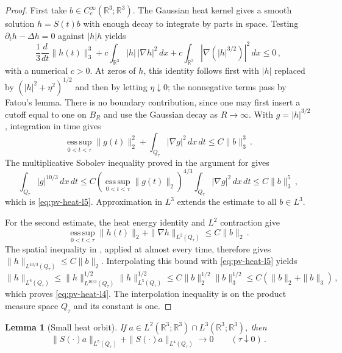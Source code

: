 \documentclass[11pt,letterpaper]{article}
\numberwithin{equation}{section}
\theoremstyle{plain}
\newtheorem{lemma}[theorem]{Lemma}
\theoremstyle{definition}
\theoremstyle{remark}
\begin{document}
\begin{proof}
First take $b\in C_c^\infty(\mathbb R^3;\mathbb R^3)$. The Gaussian heat kernel gives a smooth solution $h=S(t)b$ with enough decay to integrate by parts in space. Testing $\partial_t h-\Delta h=0$ against $|h|h$ yields
\begin{equation*}
\frac13\frac{d}{dt}\|h(t)\|_3^3+c\int_{\mathbb R^3}|h|\,|\nabla h|^2\,dx+c\int_{\mathbb R^3}|\nabla(|h|^{3/2})|^2\,dx\le0\,,
\end{equation*}
with a numerical $c>0$. At zeros of $h$, this identity follows first with $|h|$ replaced by $(|h|^2+\eta^2)^{1/2}$ and then by letting $\eta\downarrow0$; the nonnegative terms pass by Fatou's lemma. There is no boundary contribution, since one may first insert a cutoff equal to one on $B_R$ and use the Gaussian decay as $R\to\infty$. With $g=|h|^{3/2}$, integration in time gives
\begin{equation*}
\operatorname*{ess\,sup}_{0<t<\tau}\|g(t)\|_2^2+\int_{Q_\tau}|\nabla g|^2\,dx\,dt\le C\|b\|_3^3\,.
\end{equation*}
The multiplicative Sobolev inequality proved in the argument for \cite[Lemma~8.4]{CKNLean} gives
\begin{equation*}
\int_{Q_\tau}|g|^{10/3}\,dx\,dt\le C\left(\operatorname*{ess\,sup}_{0<t<\tau}\|g(t)\|_2\right)^{4/3}\int_{Q_\tau}|\nabla g|^2\,dx\,dt\le C\|b\|_3^5\,,
\end{equation*}
which is \eqref{eq:pv-heat-l5}. Approximation in $L^3$ extends the estimate to all $b\in L^3$.

For the second estimate, the heat energy identity and $L^2$ contraction give
\begin{equation*}
\operatorname*{ess\,sup}_{0<t<\tau}\|h(t)\|_2+\|\nabla h\|_{L^2(Q_\tau)}\le C\|b\|_2\,.
\end{equation*}
The spatial inequality in \cite[Lemma~8.4]{CKNLean}, applied at almost every time, therefore gives $\|h\|_{L^{10/3}(Q_\tau)}\le C\|b\|_2$. Interpolating this bound with \eqref{eq:pv-heat-l5} yields
\begin{equation*}
\|h\|_{L^4(Q_\tau)}\le \|h\|_{L^{10/3}(Q_\tau)}^{1/2}\|h\|_{L^5(Q_\tau)}^{1/2}\le C\|b\|_2^{1/2}\|b\|_3^{1/2}\le C(\|b\|_2+\|b\|_3)\,,
\end{equation*}
which proves \eqref{eq:pv-heat-l4}. The interpolation inequality is on the product measure space $Q_\tau$ and its constant is one.
\end{proof}

\begin{lemma}[Small heat orbit]\label{lem:pv-small-heat}
If $a\in L^2(\mathbb R^3;\mathbb R^3)\cap L^3(\mathbb R^3;\mathbb R^3)$, then
\begin{equation*}
\|S(\cdot)a\|_{L^5(Q_\tau)}+\|S(\cdot)a\|_{L^4(Q_\tau)}\longrightarrow0\qquad(\tau\downarrow0)\,.
\end{equation*}
\end{lemma}
\end{document}
